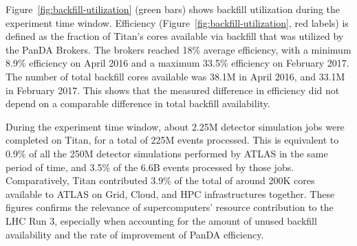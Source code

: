 Figure~\ref{fig:backfill-utilization} (green bars) shows backfill utilization
during the experiment time window. Efficiency
(Figure~\ref{fig:backfill-utilization}, red labels) is defined as the fraction
of Titan’s cores available via backfill that was utilized by the PanDA Brokers.
The brokers reached 18\% average efficiency, with a minimum 8.9\% efficiency on
April 2016 and a maximum 33.5\% efficiency on February 2017. The number of total
backfill cores available was 38.1M in April 2016, and 33.1M in February 2017.
This shows that the measured difference in efficiency did not depend on a
comparable difference in total backfill availability.


 


During the experiment time window, about 2.25M detector simulation jobs were
completed on Titan, for a total of 225M events processed. This is equivalent to
0.9\% of all the 250M detector simulations performed by ATLAS in the same period
of time, and 3.5\% of the 6.6B events processed by those jobs. Comparatively,
Titan contributed 3.9\% of the total of around 200K cores available to ATLAS on
Grid, Cloud, and HPC infrastructures together. These figures confirms the
relevance of supercomputers' resource contribution to the LHC Run 3, especially
when accounting for the amount of unused backfill availability and the rate of
improvement of PanDA efficiency.


